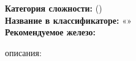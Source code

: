\section{\routeTitle}
\noindent \textbf{Категория сложности:} \routeCategory (\routeType)\\
\noindent \textbf{Название в классификаторе:} «\routeName»\\
\noindent \textbf{Рекомендуемое железо:} \routeEquipment

\hspace{1em}


\routeDescription{}

\vspace{1em}
\hfill { описания: \routeAuthors}
